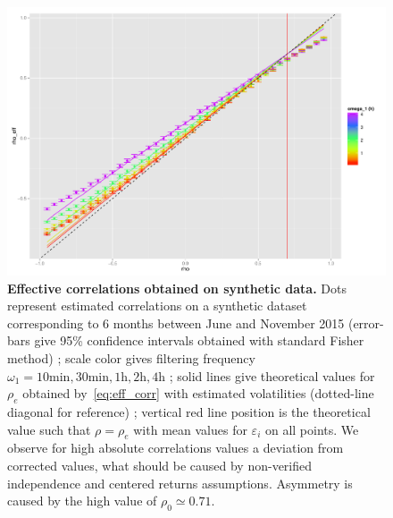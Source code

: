 \documentclass{article}
\begin{document}
\begin{figure}[h!]
\centering
\includegraphics[width=\columnwidth]{effectiveCorrs_withGoodTh_A4}
\caption{\textbf{Effective correlations obtained on synthetic data.} Dots represent estimated correlations on a synthetic dataset corresponding to 6 months between June and November 2015 (error-bars give 95\% confidence intervals obtained with standard Fisher method) ; scale color gives filtering frequency $\omega_1=10\textrm{min},30\textrm{min},1\textrm{h},2\textrm{h},4\textrm{h}$ ; solid lines give theoretical values for $\rho_e$ obtained by~\ref{eq:eff_corr} with estimated volatilities (dotted-line diagonal for reference) ; vertical red line position is the theoretical value such that $\rho = \rho_e$ with mean values for $\varepsilon_i$ on all points. We observe for high absolute correlations values a deviation from corrected values, what should be caused by non-verified independence and centered returns assumptions. Asymmetry is caused by the high value of $\rho_0 \simeq 0.71$.}
\label{fig:effective_corrs}
\end{figure}
\end{document}
